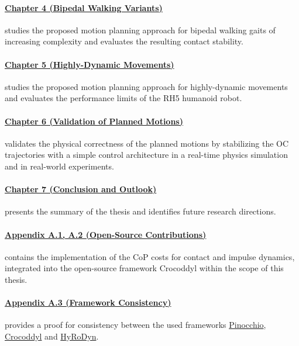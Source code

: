 \paragraph{\hyperref[c4]{Chapter 4 (Bipedal Walking Variants)}} studies the proposed motion planning approach for bipedal walking gaits of increasing complexity and evaluates the resulting contact stability. 
\paragraph{\hyperref[c5]{Chapter 5 (Highly-Dynamic Movements)}} studies the proposed motion planning approach for highly-dynamic movements and evaluates the performance limits of the RH5 humanoid robot.
\paragraph{\hyperref[c6]{Chapter 6 (Validation of Planned Motions)}} validates the physical correctness of the planned motions by stabilizing the \gls{OC} trajectories with a simple control architecture in a real-time physics simulation and in real-world experiments.
\paragraph{\hyperref[c7]{Chapter 7 (Conclusion and Outlook)}} presents the summary of the thesis and identifies future research directions. 
\paragraph{\hyperref[app:ContactCoP]{Appendix A.1, A.2 (Open-Source Contributions)}} contains the implementation of the \gls{CoP} costs for contact and impulse dynamics, integrated into the open-source framework Crocoddyl within the scope of this thesis. 
\paragraph{\hyperref[app:Consistency]{Appendix A.3 (Framework Consistency)}} provides a proof for consistency between the used frameworks \href{https://github.com/stack-of-tasks/pinocchio}{Pinocchio}, \href{https://github.com/loco-3d/crocoddyl#contact-robot-control-by-differential-dynamic-programming-library-crocoddyl}{Crocoddyl} and \href{https://robotik.dfki-bremen.de/en/research/softwaretools/hyrodyn/}{HyRoDyn}. 






















